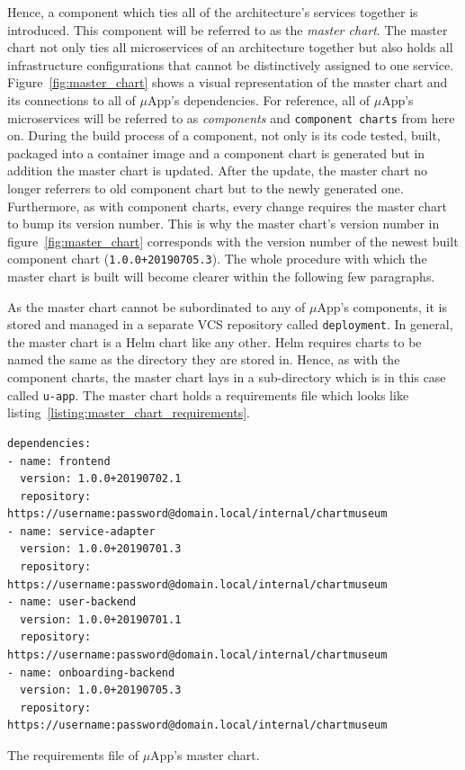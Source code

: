 Hence, a component which ties all of the architecture's services together is
introduced. This component will be referred to as the \textit{master chart}.
The master chart not only ties all microservices of an architecture together
but also holds all infrastructure configurations that cannot be distinctively
assigned to one service. Figure~\ref{fig:master_chart} shows a visual
representation of the master chart and its connections to all of $\mu$App's
dependencies. For reference, all of $\mu$App's microservices will be referred
to as \textit{components} and \texttt{component charts} from here on. During
the build process of a component, not only is its code tested, built, packaged
into a container image and a component chart is generated but in addition the
master chart is updated. After the update, the master chart no longer referrers
to old component chart but to the newly generated one. Furthermore, as with
component charts, every change requires the master chart to bump its version
number. This is why the master chart's version number in
figure~\ref{fig:master_chart} corresponds with the version number of the newest
built component chart (\texttt{1.0.0+20190705.3}). The whole procedure with
which the master chart is built will become clearer within the following few
paragraphs.

As the master chart cannot be subordinated to any of $\mu$App's components, it
is stored and managed in a separate \ac{VCS} repository called
\texttt{deployment}. In general, the master chart is a Helm chart like any
other. Helm requires charts to be named the same as the directory they are
stored in. Hence, as with the component charts, the master chart lays in a
sub-directory which is in this case called \texttt{u-app}. The master chart
holds a requirements file which looks like
listing~\ref{listing:master_chart_requirements}.

\begin{listing}[H]
  \begin{verbatim}
dependencies:
- name: frontend
  version: 1.0.0+20190702.1
  repository: https://username:password@domain.local/internal/chartmuseum
- name: service-adapter
  version: 1.0.0+20190701.3
  repository: https://username:password@domain.local/internal/chartmuseum
- name: user-backend
  version: 1.0.0+20190701.1
  repository: https://username:password@domain.local/internal/chartmuseum
- name: onboarding-backend
  version: 1.0.0+20190705.3
  repository: https://username:password@domain.local/internal/chartmuseum

  \end{verbatim}
  \caption{The requirements file of $\mu$App's master chart.}%
  \label{listing:master_chart_requirements}
\end{listing}

